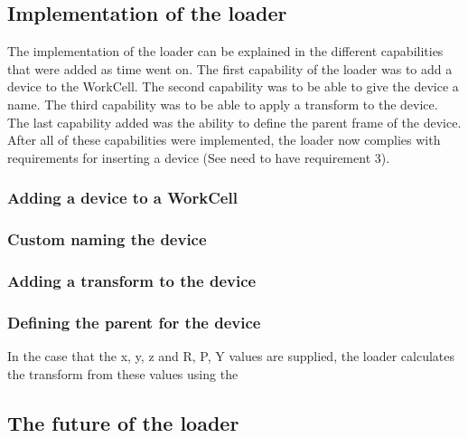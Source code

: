 \subsection{Implementation of the loader}
The implementation of the loader can be explained in the different capabilities that were added as time went on. The first capability of the loader was to add a device to the WorkCell. The second capability was to be able to give the device a name. The third capability was to be able to apply a transform to the device. The last capability added was the ability to define the parent frame of the device. After all of these capabilities were implemented, the loader now complies with requirements for inserting a device (See need to have requirement 3).

\subsubsection{Adding a device to a WorkCell}


\subsubsection{Custom naming the device}


\subsubsection{Adding a transform to the device}


\subsubsection{Defining the parent for the device}



In the case that the x, y, z and R, P, Y values are supplied, the loader calculates the transform from these values using the 

\subsection{The future of the loader}